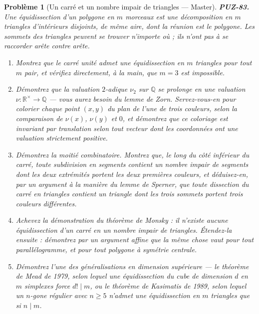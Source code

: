 \documentclass[11pt]{article}
\newtheorem{problem}{Problème}
\begin{document}
\begin{problem}[{Un carré et un nombre impair de triangles --- Master}]
\textbf{PUZ-83.} Une \textit{équidissection} d'un polygone en $ m $ morceaux est une
décomposition en $ m $ triangles d'intérieurs disjoints, de même aire, dont la réunion est
le polygone. Les sommets des triangles peuvent se trouver n'importe où ; ils n'ont pas à se
raccorder arête contre arête.
\begin{enumerate}
\item[(a)] Montrez que le carré unité admet une équidissection en $ m $ triangles pour tout
$ m $ pair, et vérifiez directement, à la main, que $ m = 3 $ est impossible.
\item[(b)] Démontrez que la valuation $ 2 $-adique $ \nu_2 $ sur $ \mathbb{Q} $ se prolonge en
une valuation $ \nu : \mathbb{R}^{\times} \to \mathbb{Q} $ --- vous aurez besoin du lemme de
Zorn. Servez-vous-en pour colorier chaque point $ (x,y) $ du plan de l'une de trois
couleurs, selon la comparaison de $ \nu(x) $, $ \nu(y) $ et $ 0 $, et démontrez que ce
coloriage est invariant par translation selon tout vecteur dont les coordonnées ont une
valuation strictement positive.
\item[(c)] Démontrez la moitié combinatoire. Montrez que, le long du côté inférieur du carré, toute
subdivision en segments contient un nombre impair de segments dont les deux extrémités
portent les deux premières couleurs, et déduisez-en, par un argument à la manière du lemme de
Sperner, que toute dissection du carré en triangles contient un triangle dont les trois
sommets portent trois couleurs différentes.
\item[(d)] Achevez la démonstration du théorème de Monsky : il n'existe aucune équidissection d'un
carré en un nombre impair de triangles. Étendez-la ensuite : démontrez par un argument affine
que la même chose vaut pour tout parallélogramme, et pour tout polygone à symétrie
centrale.
\item[(e)] Démontrez l'une des généralisations en dimension supérieure --- le théorème de Mead de
1979, selon lequel une équidissection du cube de dimension $ d $ en $ m $ simplexes force
$ d! \mid m $, ou le théorème de Kasimatis de 1989, selon lequel un $ n $-gone régulier
avec $ n \ge 5 $ n'admet une équidissection en $ m $ triangles que si $ n \mid m $.
\end{enumerate}

\end{problem}
\end{document}
